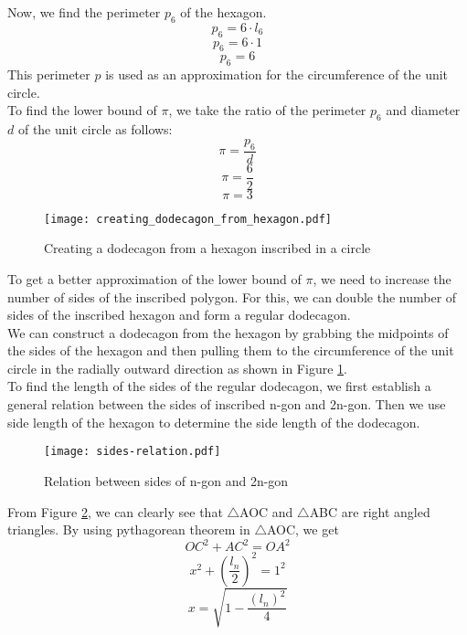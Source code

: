 \documentclass[12pt]{article}
\begin{document}
Now, we find the perimeter $p_{6}$ of the hexagon.\\
$$p_{6} = 6 \cdot l_{6}$$
$$p_{6} = 6 \cdot 1$$
$$p_{6} = 6$$
This perimeter $p$ is used as an approximation for the circumference of the unit circle.\\

To find the lower bound of $\pi$, we take the ratio of the perimeter $p_{6}$ and diameter $d$ of the unit circle as follows:\\
$$\pi = \frac{p_{6}}{d}$$
$$\pi = \frac{6}{2}$$
$$\pi = 3$$

\begin{figure}[h!]
  \texttt{[image: creating\_dodecagon\_from\_hexagon.pdf]}
  \caption{Creating a dodecagon from a hexagon inscribed in a circle}
  \label{fig:creating dodecagons}
\end{figure}

\bigskip
\bigskip
\bigskip
\bigskip
\bigskip
To get a better approximation of the lower bound of $\pi$, we need to increase the number of sides of the inscribed polygon. For this, we can double the number of sides of the inscribed hexagon and form a regular dodecagon. \\


We can construct a dodecagon from the hexagon by grabbing the midpoints of the sides of the hexagon and then pulling them to the circumference of the unit circle in the radially outward direction as shown in Figure \ref{fig:creating dodecagons}. \\


To find the length of the sides of the regular dodecagon, we first establish a
general relation between the sides of inscribed n-gon and 2n-gon. Then we use side length
of the hexagon to determine the side length of the dodecagon.

\begin{figure}[h!]
  \texttt{[image: sides-relation.pdf]}
  \caption{Relation between sides of n-gon and 2n-gon}
  \label{fig:sides relation}
\end{figure}


From Figure \ref{fig:sides relation}, we can clearly see that $\bigtriangleup$AOC and $\bigtriangleup$ABC are right angled triangles. By using pythagorean theorem in $\bigtriangleup$AOC, we get
$$OC^{2}+AC^{2}=OA^{2}$$
$$x^{2}+(\frac{l_{n}}{2})^{2} = 1^{2}$$
$$x = \sqrt{1-\frac{(l_{n})^{2}}{4}}$$
\end{document}

